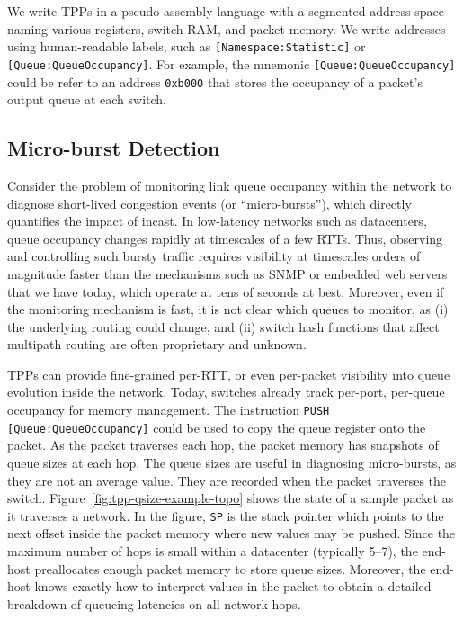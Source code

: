 We write TPPs in a pseudo-assembly-language with a segmented address
space naming various registers, switch RAM, and packet memory.
We write addresses
using human-readable labels, such as \texttt{[Namespace:Statistic]}
or \texttt{[Queue:QueueOccupancy]}.    For example, the mnemonic {\tt [Queue:QueueOccupancy]}
could be refer to an address \texttt{0xb000} that
stores the occupancy of a packet's output queue at each switch.





\subsection{Micro-burst Detection}
Consider the problem of monitoring link queue occupancy within the
network to diagnose short-lived congestion events (or
``micro-bursts''), which directly quantifies the impact of incast.  In
low-latency networks such as datacenters, queue occupancy changes
rapidly at timescales of a few RTTs.  Thus, observing and controlling
such bursty traffic requires visibility at timescales orders of
magnitude faster than the mechanisms such as SNMP or embedded web
servers that we have today, which operate at tens of seconds at best.
Moreover, even if the monitoring mechanism is fast, it is not clear
which queues to monitor, as (i) the underlying routing could change,
and (ii) switch hash functions that affect multipath routing are often
proprietary and unknown.

TPPs can provide fine-grained per-RTT, or even per-packet visibility
into queue evolution inside the network.  Today, switches
already track per-port, per-queue occupancy for memory management.  The
instruction {\tt PUSH [Queue:QueueOccupancy]} could be used to copy the queue
register onto the packet.  As the packet traverses each hop, the
packet memory has snapshots of queue sizes at each hop.  The queue
sizes are useful in diagnosing micro-bursts, as they are not an
average value.  They are recorded when the packet traverses the
switch.  Figure~\ref{fig:tpp-qsize-example-topo} shows the state of a
sample packet as it traverses a network.  In the figure, {\tt SP} is
the stack pointer which points to the next offset inside the packet
memory where new values may be pushed.  Since the maximum number of
hops is small within a datacenter (typically 5--7), the end-host
preallocates enough packet memory to store queue sizes.  Moreover, the
end-host knows exactly how to interpret values in the packet to obtain
a detailed breakdown of queueing latencies on all network hops.

